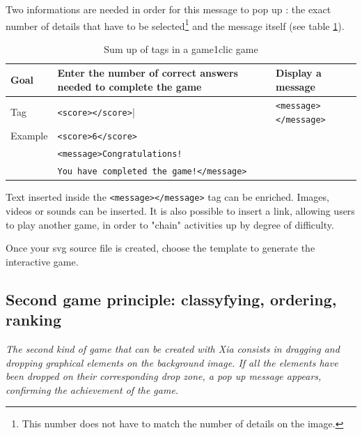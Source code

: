 Two informations are needed in order for this message to pop up :
the exact number of details that have to be selected\footnote{This number does 
not have to match the number of details on the image.}
and the message itself (see table \ref{tag1_sumup}).

\begin{table}
 \begin{tabular}{|l|p{2in}|p{2in}|}
 \hline
  Goal & Enter the number of correct answers needed to complete the game & Display a message\\
  \hline
  Tag & \texttt{<score></score>}| & \texttt{<message></message>}\\
  \hline
  Example & \multicolumn{2}{|l|}{\texttt{<score>6</score>}}\\
   & \multicolumn{2}{|l|}{\texttt{<message>Congratulations!}}\\
    & \multicolumn{2}{|l|}{\texttt{You have completed the game!</message>}}\\
  \hline
 \end{tabular}
\caption{Sum up of tags in a game1clic game}
\label{tag1_sumup}
\end{table}
 
\begin{tip}
Text inserted inside the \verb|<message></message>| tag can be 
enriched. Images, videos or sounds can be inserted.
It is also possible to insert a link, allowing users to play another game,
in order to "chain" activities up by degree of difficulty.
\end{tip}


Once your svg source file is created, choose the template  to generate the interactive game.

\subsection{Second game principle: classyfying, ordering, ranking}\label{gameDragAndDropsection}


\textit{The second kind of game that can be created with Xia consists in
dragging and dropping graphical elements on the background image. If all the
elements have been dropped on their corresponding drop zone, a pop up
message appears, confirming the achievement of the game.}

